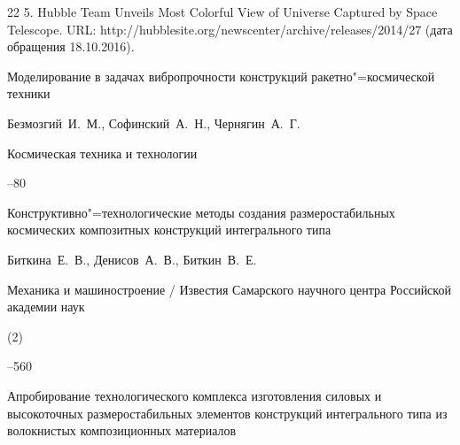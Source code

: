 \begin{thebibliography}{22}
5. Hubble Team Unveils Most Colorful View of Universe Captured by Space Telescope. URL: http://hubblesite.org/newscenter/archive/releases/2014/27 (дата обращения 18.10.2016).





\paper Моделирование в задачах вибропрочности конструкций ракетно"=космической техники

\by Безмозгий~И.~М., Софинский~А.~Н., Чернягин~А.~Г.

\jour Космическая техника и технологии



--80





\paper Конструктивно"=технологические методы создания размеростабильных космических композитных конструкций интегрального типа

\by Биткина~Е.~В., Денисов~А.~В., Биткин~В.~Е.

\jour Механика и машиностроение / Известия Самарского научного центра Российской академии наук



(2)

--560





\paper Апробирование технологического комплекса изготовления силовых и высокоточных размеростабильных элементов конструкций интегрального типа из волокнистых композиционных материалов


\end{thebibliography}
